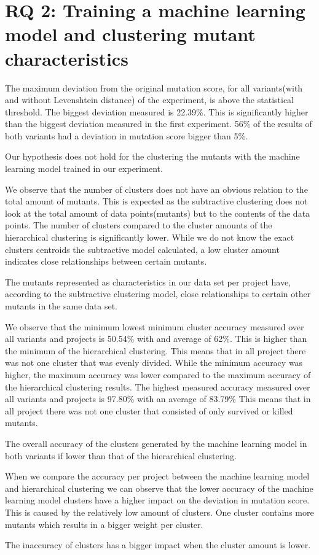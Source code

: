 \documentclass[../main]{subfiles}
\begin{document}
\section{RQ 2: Training a machine learning model and clustering mutant characteristics}
The maximum deviation from the original mutation score, for all variants(with and without Levenshtein distance) of the experiment, is above the statistical threshold.
The biggest deviation measured is 22.39\%.
This is significantly higher than the biggest deviation measured in the first experiment.
56\% of the results of both variants had a deviation in mutation score bigger than 5\%.
\begin{finding}
Our hypothesis does not hold for the clustering the mutants with the machine learning model trained in our experiment.
\end{finding}
We observe that the number of clusters does not have an obvious relation to the total amount of mutants. 
This is expected as the subtractive clustering does not look at the total amount of data points(mutants) but to the contents of the data points.
The number of clusters compared to the cluster amounts of the hierarchical clustering is significantly lower.
While we do not know the exact clusters centroids the subtractive model calculated, a low cluster amount indicates close relationships between certain mutants.
\begin{finding}
The mutants represented as characteristics in our data set per project have, according to the subtractive clustering model, close relationships to certain other mutants in the same data set.
\end{finding}
We observe that the minimum lowest minimum cluster accuracy measured over all variants and projects is 50.54\% with and average of 62\%. 
This is higher than the minimum of the hierarchical clustering.
This means that in all project there was not one cluster that was evenly divided.
While the minimum accuracy was higher, the maximum accuracy was lower compared to the maximum accuracy of the hierarchical clustering results.
The highest measured accuracy  measured over all variants and projects is 97.80\% with an average of 83.79\%
This means that in all project there was not one cluster that consisted of only survived or killed mutants.
\begin{finding}
The overall accuracy of the clusters generated by the machine learning model in both variants if lower than that of the hierarchical clustering.
\end{finding}
When we compare the accuracy per project between the machine learning model and hierarchical clustering we can observe that the lower accuracy of the machine learning model clusters have a higher impact on the deviation in mutation score.
This is caused by the relatively low amount of clusters.
One cluster contains more mutants which results in a bigger weight per cluster.
\begin{finding}
The inaccuracy of clusters has a bigger impact when the cluster amount is lower.
\end{finding}
\end{document}

